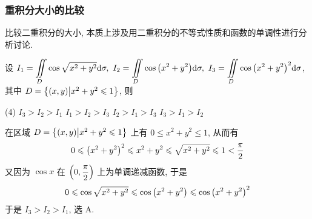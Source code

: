 \subsubsection{重积分大小的比较}

比较二重积分的大小, 本质上涉及用二重积分的不等式性质和函数的单调性进行分析讨论.

\begin{example}[2005 数一]
    设 $\displaystyle I_1=\iint\limits_D\cos\sqrt{x^2+y^2}\dd \sigma,~I_2=\iint\limits_D\cos\qty(x^2+y^2)\dd \sigma,~I_3=\iint\limits_D \cos\qty(x^2+y^2)^2\dd \sigma$, 其中 $D=\qty{(x,y)\big| x^2+y^2\leqslant 1}$, 则
    \begin{tasks}(4)
        \task $I_3>I_2>I_1$
        \task $I_1>I_2>I_3$
        \task $I_2>I_1>I_3$
        \task $I_3>I_1>I_2$
    \end{tasks}
\end{example}
\begin{solution}
    在区域 $D=\qty{(x,y)\big| x^2+y^2\leqslant 1}$ 上有 $0\leqslant x^2+y^2\leqslant 1$, 从而有
    $$0\leqslant \qty(x^2+y^2)^2\leqslant x^2+y^2\leqslant \sqrt{x^2+y^2}\leqslant 1<\dfrac{\pi}{2}$$
    又因为 $\cos x$ 在 $\qty(0,\dfrac{\pi}{2})$ 上为单调递减函数, 于是
    $$0\leqslant \cos\sqrt{x^2+y^2}\leqslant \cos\qty(x^2+y^2)\leqslant \cos\qty(x^2+y^2)^2$$
    于是 $I_3>I_2>I_1$, 选 A.
\end{solution}

